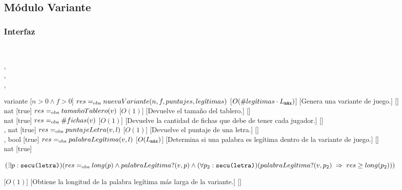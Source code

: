 \subsection{Módulo Variante}
\begin{interfaz}{\subsubsection{Interfaz}}
  \\
  \usa{\falta}
  \par\noindent
  \begin{operaciones}
    {
      \begin{adjustwidth}{2em}{}
      ,\\
      ,\\
      ,\\
      \end{adjustwidth}
    }{variante}
    [$n>0\land f>0$]
    {$res\igobs nuevaVariante(n,f,puntajes,leg\acute{\imath}timas)$}
    [$O(\#leg\acute{\imath}timas\cdot\Lmax)$]
    [Genera una variante de juego.]
    [\falta]\\

    \noindent{}
    {}{nat}
    [true]
    {$res\igobs tama\tilde{n}oTablero(v)$}
    [$O(1)$]
    [Devuelve el tamaño del tablero.]
    [\falta]\\

    \noindent{}
    {}{nat}
    [true]
    {$res\igobs \#fichas(v)$}
    [$O(1)$]
    [Devuelve la cantidad de fichas que debe de tener cada jugador.]
    [\falta]\\

    \noindent{}
    {, }{nat}
    [true]
    {$res\igobs puntajeLetra(v,l)$}
    [$O(1)$]
    [Devuelve el puntaje de una letra.]
    [\falta]\\

    \noindent{}
    {, }{bool}
    [true]
    {$res\igobs palabraLeg\acute{\imath}tima(v,l)$}
    [$O(\Lmax)$]
    [Determina si una palabra es legítima dentro de la variante de juego.]
    [\falta]\\

    \noindent{}
    {}{nat}
    [true]
    {
      \begin{adjustwidth}{2em}{}

      $(\exists p:\texttt{secu(letra)})(res\igobs long(p)\land palabraLeg\acute{\imath}tima?(v,p)\land\\(\forall p_{2}:\texttt{secu(letra)})( palabraLeg\acute{\imath}tima?(v,p_{2})\implies res\geq long(p_{2})))$
      \end{adjustwidth}
    }
    [$O(1)$]
    [Obtiene la longitud de la palabra legítima más larga de la variante.]
    [\falta]
  \end{operaciones}
\end{interfaz}
